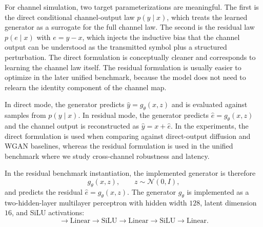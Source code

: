 For channel simulation, two target parameterizations are meaningful.
The first is the direct conditional channel-output law \(p(y \mid x)\), which treats the learned generator as a surrogate for the full channel law.
The second is the residual law \(p(e \mid x)\) with \(e = y - x\), which injects the inductive bias that the channel output can be understood as the transmitted symbol plus a structured perturbation.
The direct formulation is conceptually cleaner and corresponds to learning the channel law itself.
The residual formulation is usually easier to optimize in the later unified benchmark, because the model does not need to relearn the identity component of the channel map.

In direct mode, the generator predicts \(\hat{y} = g_\theta(x, z)\) and is evaluated against samples from \(p(y \mid x)\).
In residual mode, the generator predicts \(\hat{e} = g_\theta(x, z)\) and the channel output is reconstructed as \(\hat{y} = x + \hat{e}\).
In the experiments, the direct formulation is used when comparing against direct-output diffusion and WGAN baselines, whereas the residual formulation is used in the unified benchmark where we study cross-channel robustness and latency.

In the residual benchmark instantiation, the implemented generator is therefore
\begin{equation}
g_\theta(x, z),
\qquad
z \sim \mathcal{N}(0, I),
\end{equation}
and predicts the residual \(\hat{e} = g_\theta(x, z)\).
The generator \(g_\theta\) is implemented as a two-hidden-layer multilayer perceptron with hidden width \(128\), latent dimension \(16\), and SiLU activations:
\begin{equation}
[x, z]
\rightarrow
\mathrm{Linear}
\rightarrow
\mathrm{SiLU}
\rightarrow
\mathrm{Linear}
\rightarrow
\mathrm{SiLU}
\rightarrow
\mathrm{Linear}.
\end{equation}

